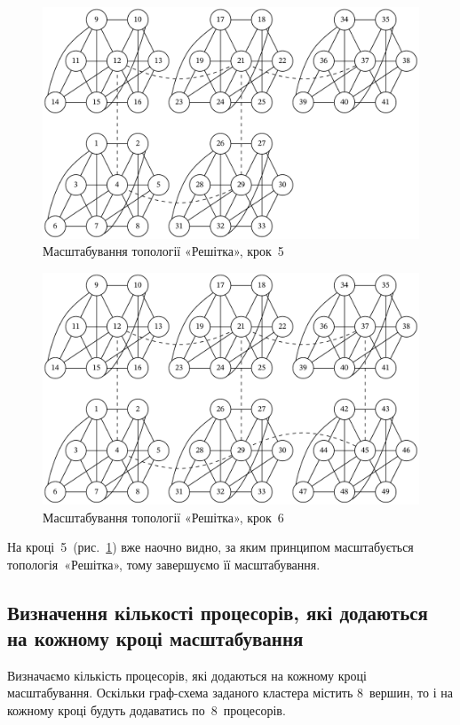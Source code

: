 \documentclass[
	a4paper,
	oneside,
	BCOR = 10mm,
	DIV = 12,
	12pt,
	headings = normal,
]{scrartcl}
\begin{document}
				\begin{figure}[!htbp]
					\centering
					\includegraphics[height=12\baselineskip]{./assets/cluster-08-05-grid-s05.pdf}
					\caption{Масштабування топології «Решітка», крок~5}
					\label{fig:cluster-08-05-grid-s05}
				\end{figure}

				\begin{figure}[!htbp]
					\centering
					\includegraphics[height=12\baselineskip]{./assets/cluster-08-05-grid-s06.pdf}
					\caption{Масштабування топології «Решітка», крок~6}
					\label{fig:cluster-08-05-grid-s06}
				\end{figure}

				На кроці~5~(рис.~\ref{fig:cluster-08-05-grid-s05}) вже наочно видно, за яким принципом масштабується топологія~«Решітка», тому завершуємо її масштабування.

		\subsection{Визначення кількості процесорів, які додаються на кожному кроці масштабування}
			Визначаємо кількість процесорів, які додаються на кожному кроці масштабування. Оскільки граф-схема заданого кластера містить 8~вершин, то і на кожному кроці будуть додаватись по~8~процесорів.
\end{document}
